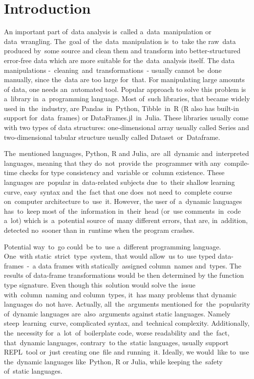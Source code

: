 \chapter*{Introduction}

An important part of~data analysis is~called a~data~manipulation or data~wrangling.
The~goal of~the~data~manipulation is~to~take the raw~data produced by~some source and clean them and transform into
better-structured error-free data which are more suitable for the~data~analysis itself.
The data manipulations -~cleaning~and~transformations~- usually cannot be~done manually, since the~data are too large
for~that.
For manipulating large amounts of data, one needs an~automated tool.
Popular approach to solve this problem is a~library in~a~programming language.
Most of~such libraries, that became widely used in~the~industry, are Pandas~in~Python, Tibble~in~R (R also has built-in
support for~data~frames) or DataFrames.jl~in~Julia.
These libraries usually come with two types of data structures: one-dimensional array usually called Series
and two-dimensional tabular structure usually called Dataset~or~Dataframe.

The~mentioned languages, Python, R and Julia, are~all~dynamic and~interpreted languages, meaning that they do~not~provide
the~programmer with any~compile-time checks for type consistency and~variable or~column existence.
These languages are~popular in~data-related subjects due~to~their shallow learning curve, easy~syntax and~the~fact that
one does~not need to~complete course on~computer architecture to~use~it.
However, the user of~a~dynamic languages has~to~keep most of~the~information in~their~head (or~use comments~in~code a~lot)
which is~a~potential source of~many different errors, that are, in~addition, detected no~sooner than in~runtime when
the program crashes.

Potential way~to~go could~be to~use a~different programming language.
One~with static~strict~type~system, that would allow~us to~use typed data-frames~-~a data frames with statically~assigned
column~names and~types.
The results of data-frame transformations would be then determined by the function type signature.
Even though this~solution would solve the~issue with~column~naming and column~types, it~has many problems that dynamic
languages do~not have.
Actually, all~the~arguments mentioned for~the~popularity of~dynamic languages are~also~arguments against static languages.
Namely steep~learning~curve, complicated syntax, and~technical complexity.
Additionally, the~necessity for~a~lot~of~boilerplate code, worse readability and~the~fact, that~dynamic languages,
contrary~to the~static languages, usually support REPL~tool or~just creating one~file and running~it.
Ideally, we would~like to~use the~dynamic languages like~Python, R or Julia, while keeping the~safety of~static languages.

